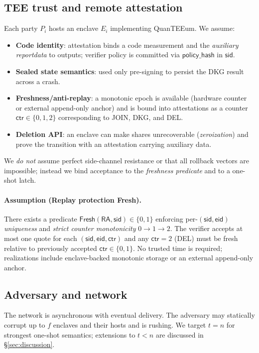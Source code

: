 \documentclass[runningheads,orivec]{llncs}
\newcommand{\prot}{\textsf{QuanTEEum}}
\begin{document}
\subsection{TEE trust and remote attestation}
Each party $P_i$ hosts an enclave $E_i$ implementing \prot{}. We assume:
\begin{itemize}[leftmargin=*,itemsep=0.25em]
  \item \textbf{Code identity}: attestation binds a code measurement and the \emph{auxiliary reportdata} to outputs; verifier policy is committed via $\mathsf{policy\_hash}$ in $\mathsf{sid}$.
  \item \textbf{Sealed state semantics}: used only pre-signing to persist the DKG result across a crash.
  \item \textbf{Freshness/anti-replay}: a monotonic epoch is available (hardware counter or external append-only anchor) and is bound into attestations as a counter $\mathsf{ctr}\in\{0,1,2\}$ corresponding to JOIN, DKG, and DEL.
  \item \textbf{Deletion API}: an enclave can make shares unrecoverable (\emph{zeroization}) and prove the transition with an attestation carrying auxiliary data.
\end{itemize}
We \emph{do not} assume perfect side-channel resistance or that all rollback vectors are impossible; instead we bind acceptance to the \emph{freshness predicate} and to a one-shot latch.

\paragraph{Assumption (Replay protection \textsf{Fresh}).}
There exists a predicate $\textsf{Fresh}(\mathsf{RA},\mathsf{sid})\!\in\!\{0,1\}$ enforcing per-$(\mathsf{sid},\mathsf{eid})$ \emph{uniqueness} and \emph{strict counter monotonicity} $0\!\rightarrow\!1\!\rightarrow\!2$. The verifier accepts at most one quote for each $(\mathsf{sid},\mathsf{eid},\mathsf{ctr})$ and any $\mathsf{ctr}{=}2$ (DEL) must be fresh relative to previously accepted $\mathsf{ctr}\in\{0,1\}$. No trusted time is required; realizations include enclave-backed monotonic storage or an external append-only anchor.

\subsection{Adversary and network}
The network is asynchronous with eventual delivery. The adversary may statically corrupt up to $f$ enclaves and their hosts and is rushing. We target $t=n$ for strongest one-shot semantics; extensions to $t<n$ are discussed in \S\ref{sec:discussion}.
\end{document}
